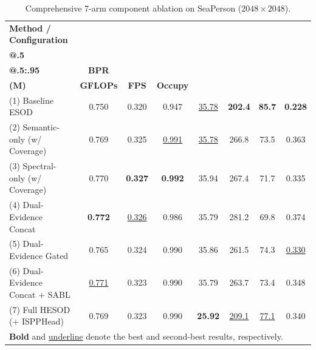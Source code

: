 \begin{table}[t]
\centering
\caption{Comprehensive 7-arm component ablation on SeaPerson ($2048\times 2048$).}
\label{tab:seaperson_ablation}
\footnotesize
\setlength{\tabcolsep}{5pt}
\begin{tabular}{lccccccc}
\toprule
\textbf{Method / Configuration} & \shortstack{\textbf{mAP}\\\textbf{@.5}} & \shortstack{\textbf{mAP}\\\textbf{@.5:.95}} & \textbf{BPR} & \shortstack{\textbf{Params}\\\textbf{(M)}} & \textbf{GFLOPs} & \textbf{FPS} & \textbf{Occupy} \\
\midrule
(1) Baseline ESOD \cite{ESOD}            & 0.750 & 0.320 & 0.947 & \underline{35.78} & \textbf{202.4} & \textbf{85.7} & \textbf{0.228} \\
(2) Semantic-only (w/ Coverage)          & 0.769 & 0.325 & \underline{0.991} & \underline{35.78} & 266.8 & 73.5 & 0.363 \\
(3) Spectral-only (w/ Coverage)          & 0.770 & \textbf{0.327} & \textbf{0.992} & 35.94 & 267.4 & 71.7 & 0.335 \\
(4) Dual-Evidence Concat                 & \textbf{0.772} & \underline{0.326} & 0.986 & 35.79 & 281.2 & 69.8 & 0.374 \\
(5) Dual-Evidence Gated                  & 0.765 & 0.324 & 0.990 & 35.86 & 261.5 & 74.3 & \underline{0.330} \\
(6) Dual-Evidence Concat + SABL          & \underline{0.771} & 0.323 & 0.990 & 35.79 & 263.7 & 73.4 & 0.348 \\
(7) Full HESOD (+ ISPPHead)              & 0.769 & 0.323 & 0.990 & \textbf{25.92} & \underline{209.1} & \underline{77.1} & 0.340 \\
\bottomrule
\multicolumn{8}{l}{\scriptsize \textbf{Bold} and \underline{underline} denote the best and second-best results, respectively.}
\end{tabular}
\end{table}

